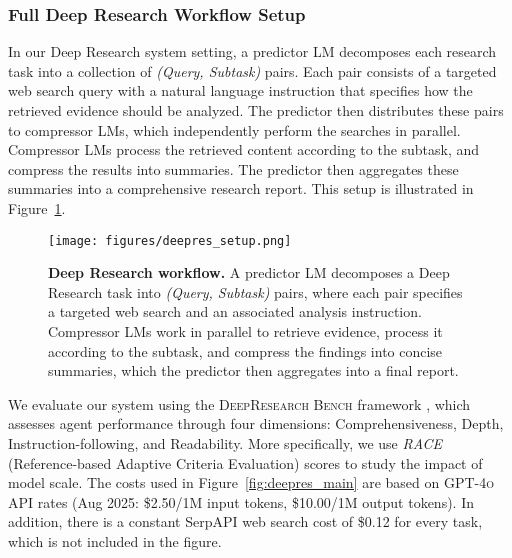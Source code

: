 \documentclass{article} %
\begin{document}
\subsubsection{Full Deep Research Workflow Setup}
\label{sec:appendix-deepresearch-workflow-setup}
In our Deep Research system setting, a predictor LM decomposes each research task into a collection of \emph{(Query, Subtask)} pairs. Each pair consists of a targeted web search query with a natural language instruction that specifies how the retrieved evidence should be analyzed. The predictor then distributes these pairs to compressor LMs, which independently perform the searches in parallel. Compressor LMs process the retrieved content according to the subtask, and compress the results into summaries. The predictor then aggregates these summaries into a comprehensive research report. This setup is illustrated in Figure~\ref{fig:deepres_setup}.
\begin{figure}[ht]
    \centering
    \texttt{[image: figures/deepres\_setup.png]}
    \caption{%
    \textbf{Deep Research workflow.}
    A predictor LM decomposes a Deep Research task into \emph{(Query, Subtask)} pairs, where each pair specifies a targeted web search and an associated analysis instruction. Compressor LMs work in parallel to retrieve evidence, process it according to the subtask, and compress the findings into concise summaries, which the predictor then aggregates into a final report.}
    \label{fig:deepres_setup}
\end{figure}


We evaluate our system using the \textsc{DeepResearch Bench} framework \citep{du2025deepresearch}, which assesses agent performance through four dimensions: Comprehensiveness, Depth, Instruction-following, and Readability. More specifically, we use \textit{RACE} (Reference-based Adaptive Criteria Evaluation) scores to study the impact of model scale. The costs used in Figure~\ref{fig:deepres_main} are based on \textsc{GPT-4o} API rates (Aug 2025: \$2.50/1M input tokens, \$10.00/1M output tokens). In addition, there is a constant SerpAPI web search cost of \$0.12 for every task, which is not included in the figure.
\end{document}
